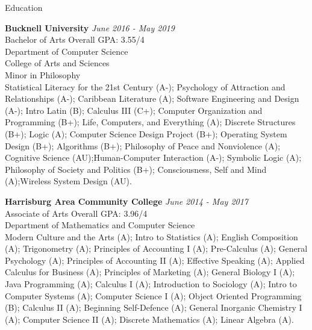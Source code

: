 \documentclass{resume} %
\begin{document}
\begin{rSection}{Education}

{\bf Bucknell University} \hfill {\em June 2016 - May 2019} 
\\ Bachelor of Arts \hfill { Overall GPA: 3.55/4}
\\ Department of Computer Science 
\\ College of Arts and Sciences
\\ Minor in Philosophy \smallskip \\
Statistical Literacy for the 21st Century (A-); Psychology of Attraction and Relationships (A-); Caribbean Literature (A); Software Engineering and Design (A-); Intro Latin (B); Calculus III (C+); Computer Organization and Programming (B+); Life, Computers, and Everything (A); Discrete Structures (B+); Logic (A); Computer Science Design Project (B+); Operating System Design (B+); Algorithms (B+); Philosophy of Peace and Nonviolence (A); Cognitive Science (AU);Human-Computer Interaction (A-); Symbolic Logic (A); Philosophy of Society and Politics (B+); Consciousness, Self and Mind (A);Wireless System Design (AU).


{\bf Harrisburg Area Community College} \hfill {\em June 2014 - May 2017} 
\\ Associate of Arts \hfill { Overall GPA: 3.96/4}
\\ Department of Mathematics and Computer Science 
\smallskip \\
Modern Culture and the Arts (A); Intro to Statistics (A); English Composition (A); Trigonometry (A); Principles of Accounting I (A); Pre-Calculus (A); General Psychology (A); Principles of Accounting II (A); Effective Speaking (A);  Applied Calculus for Business (A); Principles of Marketing (A); General Biology I (A); Java Programming (A); Calculus I (A); Introduction to Sociology (A); Intro to Computer Systems (A); Computer Science I (A); Object Oriented Programming (B); Calculus II (A); Beginning Self-Defence (A); General Inorganic Chemistry I (A); Computer Science II (A); Discrete Mathematics (A); Linear Algebra (A).



\end{rSection}
\end{document}

